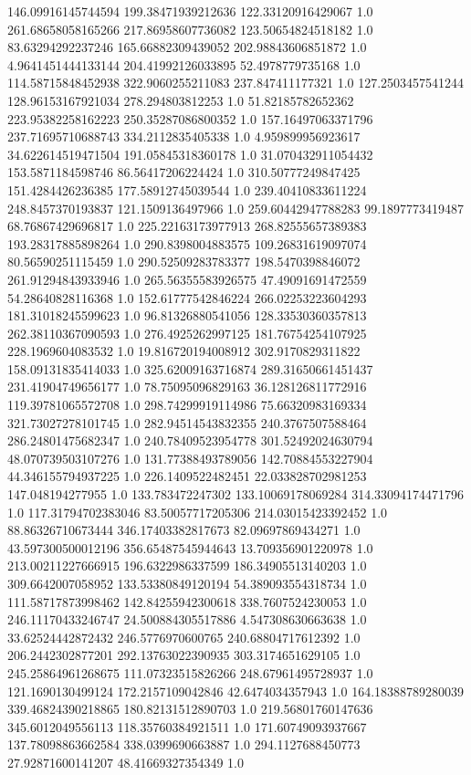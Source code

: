 146.09916145744594	199.38471939212636	122.33120916429067	1.0
261.68658058165266	217.86958607736082	123.50654824518182	1.0
83.63294292237246	165.66882309439052	202.98843606851872	1.0
4.9641451444133144	204.41992126033895	52.4978779735168	1.0
114.58715848452938	322.9060255211083	237.847411177321	1.0
127.2503457541244	128.96153167921034	278.294803812253	1.0
51.82185782652362	223.95382258162223	250.35287086800352	1.0
157.16497063371796	237.71695710688743	334.2112835405338	1.0
4.959899956923617	34.622614519471504	191.05845318360178	1.0
31.070432911054432	153.5871184598746	86.56417206224424	1.0
310.50777249847425	151.4284426236385	177.58912745039544	1.0
239.40410833611224	248.8457370193837	121.1509136497966	1.0
259.60442947788283	99.1897773419487	68.76867429696817	1.0
225.22163173977913	268.82555657389383	193.28317885898264	1.0
290.8398004883575	109.26831619097074	80.56590251115459	1.0
290.52509283783377	198.5470398846072	261.91294843933946	1.0
265.56355583926575	47.49091691472559	54.28640828116368	1.0
152.61777542846224	266.02253223604293	181.31018245599623	1.0
96.81326880541056	128.33530360357813	262.38110367090593	1.0
276.4925262997125	181.76754254107925	228.1969604083532	1.0
19.816720194008912	302.9170829311822	158.09131835414033	1.0
325.62009163716874	289.31650661451437	231.41904749656177	1.0
78.75095096829163	36.128126811772916	119.39781065572708	1.0
298.74299919114986	75.66320983169334	321.73027278101745	1.0
282.94514543832355	240.3767507588464	286.24801475682347	1.0
240.78409523954778	301.52492024630794	48.070739503107276	1.0
131.77388493789056	142.70884553227904	44.346155794937225	1.0
226.1409522482451	22.033828702981253	147.048194277955	1.0
133.783472247302	133.10069178069284	314.33094174471796	1.0
117.31794702383046	83.50057717205306	214.03015423392452	1.0
88.86326710673444	346.17403382817673	82.09697869434271	1.0
43.597300500012196	356.65487545944643	13.709356901220978	1.0
213.00211227666915	196.6322986337599	186.34905513140203	1.0
309.6642007058952	133.53380849120194	54.389093554318734	1.0
111.58717873998462	142.84255942300618	338.7607524230053	1.0
246.11170433246747	24.500884305517886	4.547308630663638	1.0
33.62524442872432	246.5776970600765	240.68804717612392	1.0
206.2442302877201	292.13763022390935	303.3174651629105	1.0
245.25864961268675	111.07323515826266	248.67961495728937	1.0
121.1690130499124	172.2157109042846	42.6474034357943	1.0
164.18388789280039	339.46824390218865	180.82131512890703	1.0
219.56801760147636	345.6012049556113	118.35760384921511	1.0
171.60749093937667	137.78098863662584	338.0399690663887	1.0
294.1127688450773	27.92871600141207	48.41669327354349	1.0
